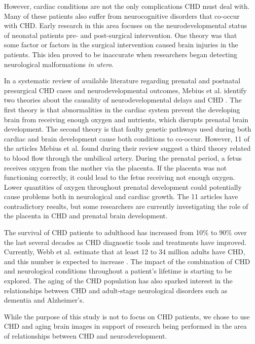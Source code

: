 
However, cardiac conditions are not the only complications CHD must deal with. Many of these patients also suffer from neurocognitive disorders that co-occur with CHD. Early research in this area focuses on the neurodevelopmental status of neonatal patients pre- and post-surgical intervention. One theory was that some factor or factors in the surgical intervention caused brain injuries in the patients. This idea proved to be inaccurate when researchers began detecting neurological malformations \textit{in utero}.

In a systematic review of available literature regarding prenatal and postnatal presurgical CHD cases and neurodevelopmental outcomes, Mebius et al. identify two theories about the causality of neurodevelopmental delays and CHD \cite{Mebius2017}. The first theory is that abnormalities in the cardiac system prevent the developing brain from receiving enough oxygen and nutrients, which disrupts prenatal brain development. The second theory is that faulty genetic pathways used during both cardiac and brain development cause both conditions to co-occur. However, 11 of the articles Mebius et al. found during their review suggest a third theory related to blood flow through the umbilical artery. During the prenatal period, a fetus receives oxygen from the mother via the placenta. If the placenta was not functioning correctly, it could lead to the fetus receiving not enough oxygen. Lower quantities of oxygen throughout prenatal development could potentially cause problems both in neurological and cardiac growth. The 11 articles have contradictory results, but some researchers are currently investigating the role of the placenta in CHD and prenatal brain development.

The survival of CHD patients to adulthood has increased from 10\% to 90\% over the last several decades as CHD diagnostic tools and treatments have improved.  Currently, Webb et al. estimate that at least 12 to 34 million adults have CHD, and this number is expected to increase \cite{Webb2015}. The impact of the combination of CHD and neurological conditions throughout a patient's lifetime is starting to be explored. The aging of the CHD population has also sparked interest in the relationships between CHD and adult-stage neurological disorders such as dementia and Alzheimer's. 

While the purpose of this study is not to focus on CHD patients, we chose to use CHD and aging brain images in support of research being performed in the area of relationships between CHD and neurodevelopment.

